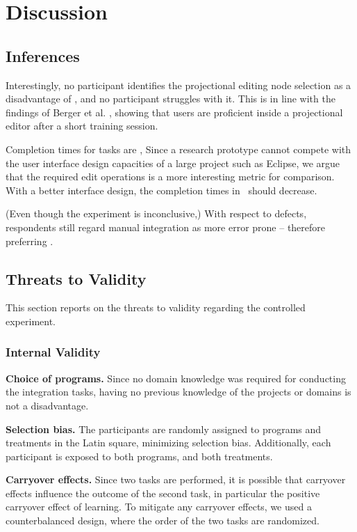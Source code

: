 \chapter{Discussion}
\section{Inferences}
Interestingly, no participant identifies the projectional editing node selection as a disadvantage of \tooln, and no participant struggles with it. This is in line with the findings of Berger et al. \cite{berger2016mps}, showing that users are proficient inside a projectional editor after a short training session.

Completion times for tasks are , Since a research prototype cannot compete with the user interface design capacities of a large project such as Eclipse, we argue that the required edit operations is a more interesting metric for comparison. With a better interface design, the completion times in \tooln~should decrease. 

(Even though the experiment is inconclusive,)
With respect to defects, respondents still regard manual integration as more error prone -- therefore preferring \tooln.

\section{Threats to Validity}
This section reports on the threats to validity regarding the controlled experiment.

\subsection{Internal Validity}
\textbf{Choice of programs.} 
Since no domain knowledge was required for conducting the integration tasks, having no previous knowledge of the projects or domains is not a disadvantage.

\textbf{Selection bias.} The participants are randomly assigned to programs and treatments in the Latin square, minimizing selection bias. Additionally, each participant is exposed to both programs, and both treatments.

\textbf{Carryover effects.} Since two tasks are performed, it is possible that carryover effects influence the outcome of the second task, in particular the positive carryover effect of learning. To mitigate any carryover effects, we used a counterbalanced design, where the order of the two tasks are randomized.

